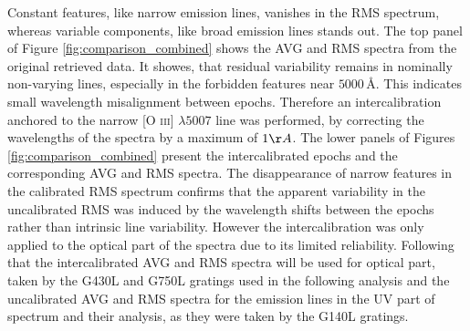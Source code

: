 Constant features, like narrow emission lines, vanishes in the RMS spectrum, whereas variable components, like broad emission lines stands out. The top panel of Figure \ref{fig:comparison_combined} shows the AVG and RMS spectra from the original retrieved data. It showes, that residual variability remains in nominally non-varying lines, especially in the forbidden features near $5000\,\text{\AA}$. This indicates small wavelength misalignment between epochs. Therefore an intercalibration anchored to the narrow [O \textsc{iii}] $\lambda5007$ line was performed, by correcting the wavelengths of the spectra by a maximum of $1\AA$. The lower panels of Figures \ref{fig:comparison_combined} present the intercalibrated epochs and the corresponding AVG and RMS spectra. The disappearance of narrow features in the calibrated RMS spectrum confirms that the apparent variability in the uncalibrated RMS was induced by the wavelength shifts between the epochs rather than intrinsic line variability. However the intercalibration was only applied to the optical part of the spectra  due to its limited reliability. Following that the intercalibrated AVG and RMS spectra will be used for optical part, taken by the G430L and G750L gratings used in the following analysis and the uncalibrated AVG and RMS spectra for the emission lines in the UV part of spectrum and their analysis, as they were taken by the G140L gratings. 

